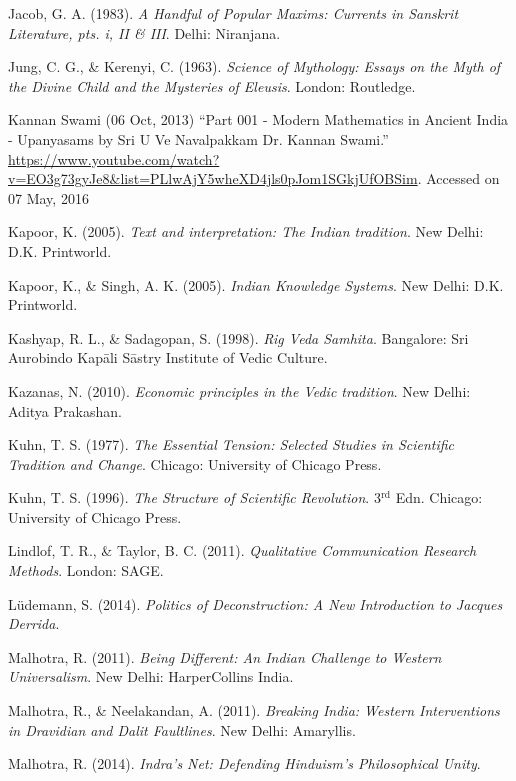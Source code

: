 \begin{thebibliography}{99}
Jacob, G. A. (1983). {\sl A Handful of Popular Maxims: Currents in Sanskrit Literature, pts. i, II \& III}. Delhi: Niranjana.

Jung, C. G., \& Kerenyi, C. (1963). {\sl Science of Mythology: Essays on the Myth of the Divine Child and the Mysteries of Eleusis}. London: Routledge. 

Kannan Swami (06 Oct, 2013) ``Part 001 - Modern Mathematics in Ancient India - Upanyasams by Sri U Ve Navalpakkam Dr. Kannan Swami.'' \url{https://www.youtube.com/watch?v=EO3g73gyJe8&list=PLlwAjY5wheXD4jls0pJom1SGkjUfOBSim}. Accessed on 07 May, 2016

Kapoor, K. (2005). {\sl Text and interpretation: The Indian tradition}. New Delhi: D.K. Printworld. 

Kapoor, K., \& Singh, A. K. (2005). {\sl Indian Knowledge Systems}. New Delhi: D.K. Printworld.

Kashyap, R. L., \& Sadagopan, S. (1998). {\sl Rig Veda Samhita}. Bangalore: Sri Aurobindo Kapāli Sāstry Institute of Vedic Culture.

Kazanas, N. (2010). {\sl Economic principles in the Vedic tradition}. New Delhi: Aditya Prakashan.

Kuhn, T. S. (1977). {\sl The Essential Tension: Selected Studies in Scientific Tradition and Change}. Chicago: University of Chicago Press.

Kuhn, T. S. (1996). {\sl The Structure of Scientific Revolution}. 3$^{\text{rd}}$ Edn. Chicago: University of Chicago Press.

Lindlof, T. R., \& Taylor, B. C. (2011). {\sl Qualitative Communication Research Methods}. London: SAGE.

Lüdemann, S. (2014). {\sl Politics of Deconstruction: A New Introduction to Jacques Derrida}. 

Malhotra, R. (2011). {\sl Being Different: An Indian Challenge to Western Universalism}. New Delhi: HarperCollins  India. 

Malhotra, R., \& Neelakandan, A. (2011). {\sl Breaking India: Western Interventions in Dravidian and Dalit Faultlines}. New Delhi: Amaryllis.

Malhotra, R. (2014). {\sl Indra's Net: Defending Hinduism's Philosophical Unity}. 


\end{thebibliography}
